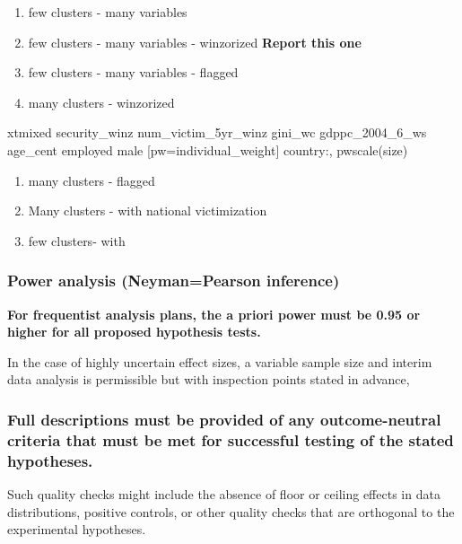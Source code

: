 \documentclass[
  english,
  man]{apa6}
\providecommand{\tightlist}{%
  \setlength{\itemsep}{0pt}\setlength{\parskip}{0pt}}
\begin{document}
\begin{enumerate}
\def\labelenumi{\arabic{enumi}.}
\setcounter{enumi}{2}
\tightlist
\item
  few clusters - many variables
\item
  few clusters - many variables - winzorized \textbf{Report this one}
\item
  few clusters - many variables - flagged
\item
  many clusters - winzorized
\end{enumerate}

xtmixed security\_winz num\_victim\_5yr\_winz gini\_wc gdppc\_2004\_6\_ws age\_cent employed male {[}pw=individual\_weight{]} \textbar\textbar{} country:, pwscale(size)

\begin{enumerate}
\def\labelenumi{\arabic{enumi}.}
\setcounter{enumi}{6}
\tightlist
\item
  many clusters - flagged
\item
  Many clusters - with national victimization
\item
  few clusters- with
\end{enumerate}

\hypertarget{power-analysis-neymanpearson-inference}{%
\subsubsection{Power analysis (Neyman=Pearson inference)}\label{power-analysis-neymanpearson-inference}}

\textbf{For frequentist analysis plans, the a priori power must be 0.95 or higher for all proposed hypothesis tests.}

In the case of highly uncertain effect sizes, a variable sample size and interim data analysis is permissible but with inspection points stated in advance,

\hypertarget{full-descriptions-must-be-provided-of-any-outcome-neutral-criteria-that-must-be-met-for-successful-testing-of-the-stated-hypotheses.}{%
\subsubsection{Full descriptions must be provided of any outcome-neutral criteria that must be met for successful testing of the stated hypotheses.}\label{full-descriptions-must-be-provided-of-any-outcome-neutral-criteria-that-must-be-met-for-successful-testing-of-the-stated-hypotheses.}}

Such quality checks might include the absence of floor or ceiling effects in data distributions, positive controls, or other quality checks that are orthogonal to the experimental hypotheses.
\end{document}

